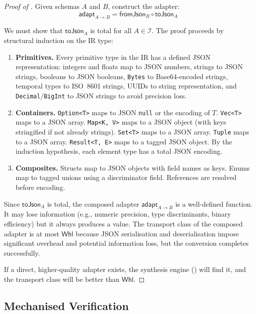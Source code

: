 \documentclass[11pt,a4paper]{article}
\theoremstyle{definition}
\theoremstyle{remark}
\newcommand{\IR}{\mathcal{I}}                    %
\newcommand{\wheel}{\textsf{Whl}}               %
\newcommand{\adapt}{\mathsf{adapt}}              %
\begin{document}
\begin{proof}[Proof of ]
Given schemas $A$ and $B$, construct the adapter:
\[
  \adapt_{A \to B} = \mathsf{fromJson}_B \circ \mathsf{toJson}_A
\]

We must show that $\mathsf{toJson}_A$ is total for all $A \in \IR$.
The proof proceeds by structural induction on the IR type:

\begin{enumerate}
  \item \textbf{Primitives.} Every primitive type in the IR has a
    defined JSON representation: integers and floats map to JSON
    numbers, strings to JSON strings, booleans to JSON booleans,
    \texttt{Bytes} to Base64-encoded strings, temporal types to
    ISO~8601 strings, UUIDs to string representation, and
    \texttt{Decimal}/\texttt{BigInt} to JSON strings to avoid
    precision loss.

  \item \textbf{Containers.} \texttt{Option<T>} maps to JSON
    \texttt{null} or the encoding of $T$. \texttt{Vec<T>} maps to a
    JSON array. \texttt{Map<K, V>} maps to a JSON object (with keys
    stringified if not already strings). \texttt{Set<T>} maps to a
    JSON array. \texttt{Tuple} maps to a JSON array.
    \texttt{Result<T, E>} maps to a tagged JSON object.
    By the induction hypothesis, each element type has a total
    JSON encoding.

  \item \textbf{Composites.} Structs map to JSON objects with field
    names as keys. Enums map to tagged unions using a discriminator
    field. References are resolved before encoding.
\end{enumerate}

Since $\mathsf{toJson}_A$ is total, the composed adapter
$\adapt_{A \to B}$ is a well-defined function. It may lose
information (e.g., numeric precision, type discriminants, binary
efficiency) but it always produces a value. The transport class of
the composed adapter is at most $\wheel$ because JSON serialisation
and deserialisation impose significant overhead and potential
information loss, but the conversion completes successfully.

If a direct, higher-quality adapter exists, the synthesis engine
() will find it, and the transport class will be
better than $\wheel$.
\end{proof}

\subsection{Mechanised Verification}
\end{document}
